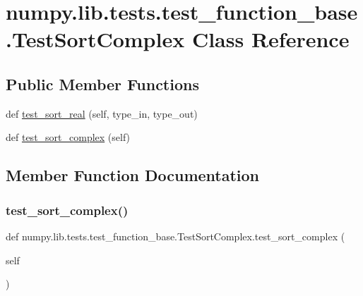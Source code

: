 \hypertarget{classnumpy_1_1lib_1_1tests_1_1test__function__base_1_1TestSortComplex}{}\section{numpy.\+lib.\+tests.\+test\+\_\+function\+\_\+base.\+Test\+Sort\+Complex Class Reference}
\label{classnumpy_1_1lib_1_1tests_1_1test__function__base_1_1TestSortComplex}
\subsection*{Public Member Functions}
\begin{DoxyCompactItemize}
\item 
def \hyperlink{classnumpy_1_1lib_1_1tests_1_1test__function__base_1_1TestSortComplex_ac738f87f13bcccabfe0846fa8f04b6e1}{test\+\_\+sort\+\_\+real} (self, type\+\_\+in, type\+\_\+out)
\item 
def \hyperlink{classnumpy_1_1lib_1_1tests_1_1test__function__base_1_1TestSortComplex_ae76c3600ac564b39906f4ddcd1d4b816}{test\+\_\+sort\+\_\+complex} (self)
\end{DoxyCompactItemize}


\subsection{Member Function Documentation}
\mbox{\label{classnumpy_1_1lib_1_1tests_1_1test__function__base_1_1TestSortComplex_ae76c3600ac564b39906f4ddcd1d4b816}} 
\subsubsection{\texorpdfstring{test\+\_\+sort\+\_\+complex()}{test\_sort\_complex()}}
{\footnotesize\ttfamily def numpy.\+lib.\+tests.\+test\+\_\+function\+\_\+base.\+Test\+Sort\+Complex.\+test\+\_\+sort\+\_\+complex (\begin{DoxyParamCaption}\item[{}]{self }\end{DoxyParamCaption})}

